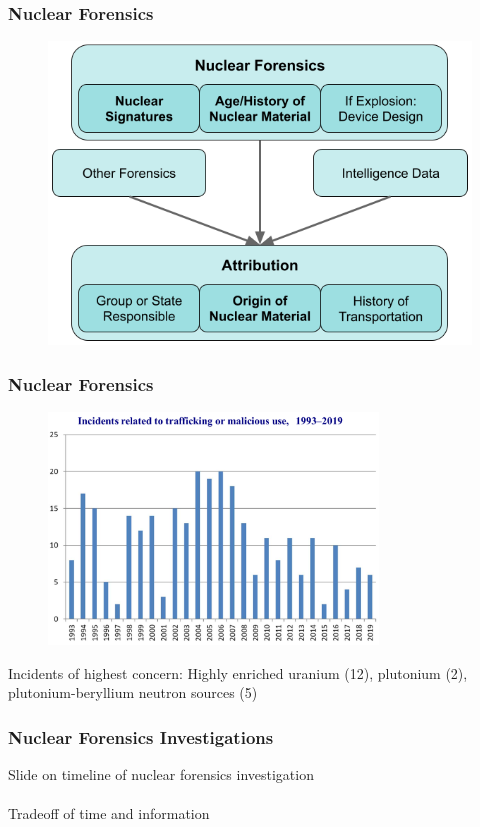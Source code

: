 
\begin{frame}
  \frametitle{Nuclear Forensics}
  \begin{figure}
    \centering
    \includegraphics[height=0.85\textheight]{./figures/nf_define.png}
  \end{figure}
\end{frame}

\begin{frame}
  \frametitle{Nuclear Forensics}
  \begin{figure}
    \centering
    \includegraphics[width=0.78\textwidth]{./figures/nucleartrafficking.png}
  \end{figure}
  Incidents of highest concern: Highly enriched uranium (12), plutonium (2), 
  plutonium-beryllium neutron sources (5) \cite{itdb}
\end{frame}

\begin{frame}
  \frametitle{Nuclear Forensics Investigations}
  Slide on timeline of nuclear forensics investigation\\~\\
  Tradeoff of time and information
\end{frame}

